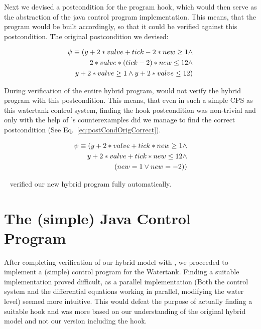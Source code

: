 Next we devised a postcondition for the program hook, which would then serve as the abstraction of the java control program implementation. This means, that the program would be built accordingly, so that it could be verified against this postcondition. The original postcondition we devised:

\begin{equation}
	\centering
	\begin{split}
		\psi \equiv (y + 2* valve + tick -2 * new  \geq 1 \wedge \\ 2 * valve * (tick - 2) * new \leq 12 \wedge \\  y + 2* valve \geq 1 \wedge  y + 2 * valve \leq 12) 
	\end{split}
\label{eq:postCondOrig}
\end{equation}

During verification of the entire hybrid program, \keym would not verify the hybrid program with this postcondition. This means, that even in such a simple CPS as this watertank control system, finding the hook postcondition was non-trivial and only with the help of \keym's counterexamples did we manage to find the correct postcondition (See Eq.~\ref{eq:postCondOrigCorrect}). 

\begin{equation}
	\centering
	\begin{split}
		\psi \equiv (y + 2 * valve + tick * new \geq 1 \wedge\\ y + 2 * valve + tick * new \leq 12 \wedge \\(new = 1  \vee new = -2))
	\end{split}
	\label{eq:postCondOrigCorrect}
\end{equation}

\keym~ verified our new hybrid program fully automatically.

\section{The (simple) Java Control Program}
\label{sec:Watertank:Java}

After completing verification of our hybrid model with \keym, we proceeded to implement a (simple) control program for the Watertank. Finding a suitable implementation proved difficult, as a parallel implementation (Both the control system and the differential equations working in parallel, modifying the water level) seemed more intuitive. This would defeat the purpose of actually finding a suitable hook and was more based on our understanding of the original hybrid model and not our version including the hook.

